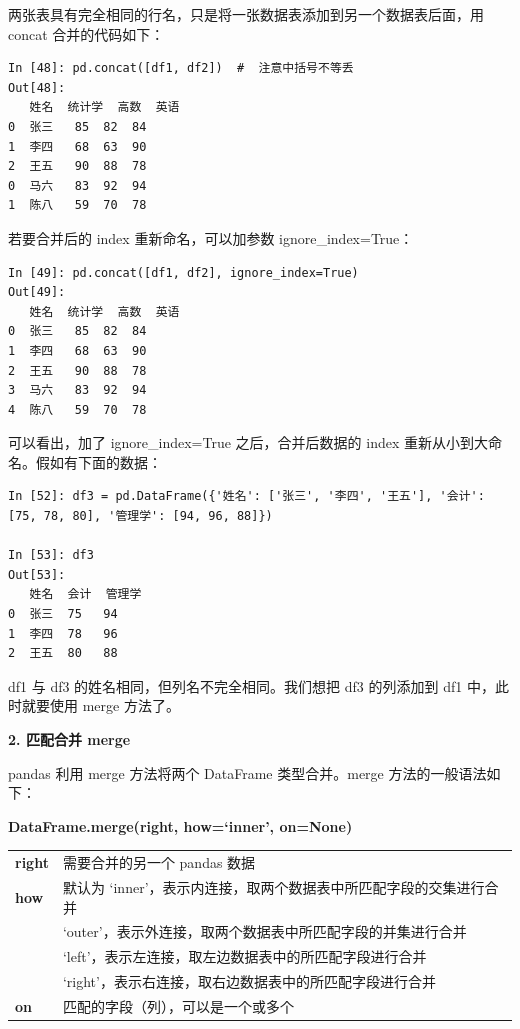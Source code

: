 两张表具有完全相同的行名，只是将一张数据表添加到另一个数据表后面，用 concat 合并的代码如下：

\begin{lstlisting}[Language=Python]
In [48]: pd.concat([df1, df2])  #  注意中括号不等丢
Out[48]:
   姓名  统计学  高数  英语
0  张三   85  82  84
1  李四   68  63  90
2  王五   90  88  78
0  马六   83  92  94
1  陈八   59  70  78
\end{lstlisting}

若要合并后的 index 重新命名，可以加参数 ignore\_index=True：

\begin{lstlisting}[Language=Python]
In [49]: pd.concat([df1, df2], ignore_index=True)
Out[49]:
   姓名  统计学  高数  英语
0  张三   85  82  84
1  李四   68  63  90
2  王五   90  88  78
3  马六   83  92  94
4  陈八   59  70  78
\end{lstlisting}

可以看出，加了 ignore\_index=True 之后，合并后数据的 index 重新从小到大命名。假如有下面的数据：

\begin{lstlisting}[Language=Python]
In [52]: df3 = pd.DataFrame({'姓名': ['张三', '李四', '王五'], '会计': [75, 78, 80], '管理学': [94, 96, 88]})

In [53]: df3
Out[53]:
   姓名  会计  管理学
0  张三  75   94
1  李四  78   96
2  王五  80   88
\end{lstlisting}

df1 与 df3 的姓名相同，但列名不完全相同。我们想把 df3 的列添加到 df1 中，此时就要使用 merge 方法了。

\vspace{3pt}
\noindent\textbf{2. 匹配合并 merge }
\vspace{3pt}

pandas 利用 merge 方法将两个 DataFrame 类型合并。merge 方法的一般语法如下：


\begin{center}
\begin{tcolorbox}[title = merge 的语法]
\textbf{DataFrame.merge(right, how=`inner', on=None)}
\tcblower
\vspace{10pt}

\begin{tcboutputlisting}
\begin{tabular}{>{\bfseries}ll}
  right &需要合并的另一个 pandas 数据\\
how & 默认为 `inner'，表示内连接，取两个数据表中所匹配字段的交集进行合并\\
 & `outer'，表示外连接，取两个数据表中所匹配字段的并集进行合并\\
&  `left'，表示左连接，取左边数据表中的所匹配字段进行合并\\
 & `right'，表示右连接，取右边数据表中的所匹配字段进行合并\\
on &匹配的字段（列），可以是一个或多个\\
\end{tabular}
\end{tcboutputlisting}
\tcbuselistingtext
\end{tcolorbox}
\end{center}

